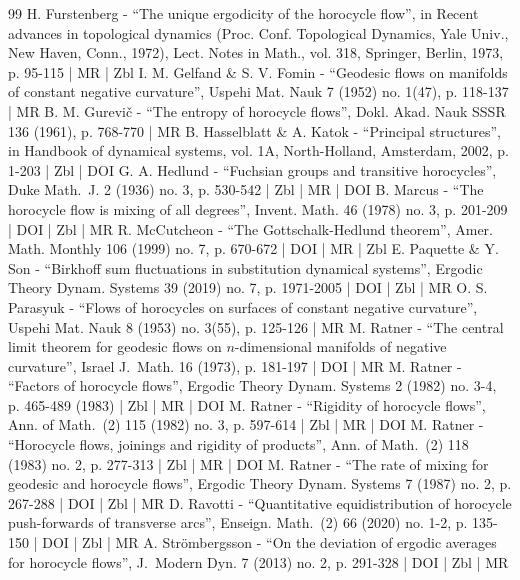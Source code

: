 \documentclass[10pt]{amsart}
\theoremstyle{definition}
\begin{document}
\begin{thebibliography}{99}
H. Furstenberg - “The unique ergodicity of the horocycle flow”, in Recent advances in topological dynamics (Proc. Conf. Topological Dynamics, Yale Univ., New Haven, Conn., 1972), Lect. Notes in Math., vol. 318, Springer, Berlin, 1973, p. 95-115 | MR | Zbl
I. M. Gelfand \& S. V. Fomin - “Geodesic flows on manifolds of constant negative curvature”, Uspehi Mat. Nauk 7 (1952) no. 1(47), p. 118-137 | MR
B. M. Gurevič - “The entropy of horocycle flows”, Dokl. Akad. Nauk SSSR 136 (1961), p. 768-770 | MR
B. Hasselblatt \& A. Katok - “Principal structures”, in Handbook of dynamical systems, vol. 1A, North-Holland, Amsterdam, 2002, p. 1-203 | Zbl | DOI
G. A. Hedlund - “Fuchsian groups and transitive horocycles”, Duke Math. J. 2 (1936) no. 3, p. 530-542 | Zbl | MR | DOI
B. Marcus - “The horocycle flow is mixing of all degrees”, Invent. Math. 46 (1978) no. 3, p. 201-209 | DOI | Zbl | MR
R. McCutcheon - “The Gottschalk-Hedlund theorem”, Amer. Math. Monthly 106 (1999) no. 7, p. 670-672 | DOI | MR | Zbl
E. Paquette \& Y. Son - “Birkhoff sum fluctuations in substitution dynamical systems”, Ergodic Theory Dynam. Systems 39 (2019) no. 7, p. 1971-2005 | DOI | Zbl | MR
O. S. Parasyuk - “Flows of horocycles on surfaces of constant negative curvature”, Uspehi Mat. Nauk 8 (1953) no. 3(55), p. 125-126 | MR
M. Ratner - “The central limit theorem for geodesic flows on $n$-dimensional manifolds of negative curvature”, Israel J. Math. 16 (1973), p. 181-197 | DOI | MR
M. Ratner - “Factors of horocycle flows”, Ergodic Theory Dynam. Systems 2 (1982) no. 3-4, p. 465-489 (1983) | Zbl | MR | DOI
M. Ratner - “Rigidity of horocycle flows”, Ann. of Math. (2) 115 (1982) no. 3, p. 597-614 | Zbl | MR | DOI
M. Ratner - “Horocycle flows, joinings and rigidity of products”, Ann. of Math. (2) 118 (1983) no. 2, p. 277-313 | Zbl | MR | DOI
M. Ratner - “The rate of mixing for geodesic and horocycle flows”, Ergodic Theory Dynam. Systems 7 (1987) no. 2, p. 267-288 | DOI | Zbl | MR
D. Ravotti - “Quantitative equidistribution of horocycle push-forwards of transverse arcs”, Enseign. Math. (2) 66 (2020) no. 1-2, p. 135-150 | DOI | Zbl | MR
A. Strömbergsson - “On the deviation of ergodic averages for horocycle flows”, J. Modern Dyn. 7 (2013) no. 2, p. 291-328 | DOI | Zbl | MR
\end{thebibliography}
\end{document}
